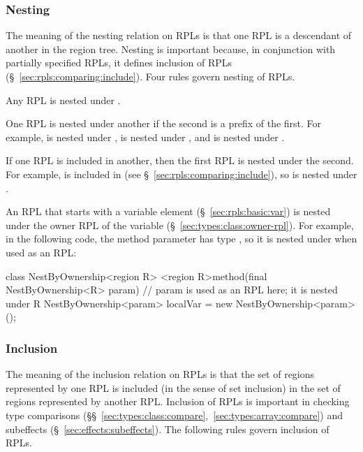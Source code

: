\subsubsection{Nesting%
\label{sec:rpls:comparing:nest}}

The meaning of the nesting relation on RPLs is that one RPL is a
descendant of another in the region tree.  Nesting is important
because, in conjunction with partially specified RPLs, it defines
inclusion of RPLs (\S~\ref{sec:rpls:comparing:include}).  Four rules
govern nesting of RPLs.

  Any RPL is nested under
.

 One RPL is nested under another if the
second is a prefix of the first.  For example,  is nested
under ,  is nested under , and 
is nested under .

 If one RPL is included in another, then
the first RPL is nested under the second.  For example,  is
included in  (see \S~\ref{sec:rpls:comparing:include}), so
 is nested under .

 An RPL that starts with a variable
element (\S~\ref{sec:rpls:basic:var}) is nested under the owner RPL of
the variable (\S~\ref{sec:types:class:owner-rpl}).  For example, in
the following code, the method parameter  has type
, so it is nested under  when used as
an RPL:
%
\begin{dpjlisting}
class NestByOwnership<region R> {
    <region R>method(final NestByOwnership<R> param) {
        // param is used as an RPL here; it is nested under R
        NestByOwnership<param> localVar = new NestByOwnership<param>();
    }
}
\end{dpjlisting}

\subsubsection{Inclusion%
\label{sec:rpls:comparing:include}}

The meaning of the inclusion relation on RPLs is that the set of
regions represented by one RPL is included (in the sense of set
inclusion) in the set of regions represented by another RPL.
Inclusion of RPLs is important in checking type comparisons
(\S\S~\ref{sec:types:class:compare},~\ref{sec:types:array:compare})
and subeffects (\S~\ref{sec:effects:subeffects}).  The following rules
govern inclusion of RPLs.

